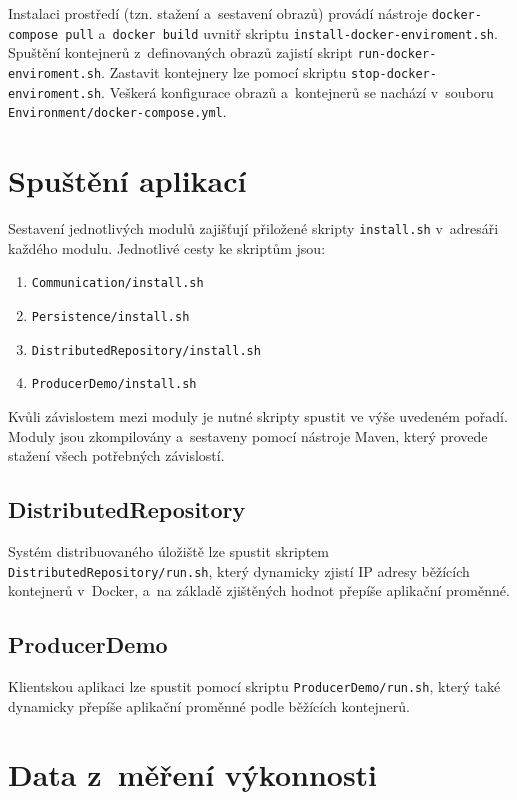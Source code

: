 Instalaci prostředí (tzn. stažení a~sestavení obrazů) provádí nástroje \texttt{docker-compose pull} a~\texttt{docker build} uvnitř skriptu \texttt{install-docker-enviroment.sh}. Spuštění kontejnerů z~definovaných obrazů zajistí skript \texttt{run-docker-enviroment.sh}. Zastavit kontejnery lze pomocí skriptu \texttt{stop-docker-enviroment.sh}. Veškerá konfigurace obrazů a~kontejnerů se nachází v~souboru \texttt{Environment/docker-compose.yml}.

\chapter{Spuštění aplikací} \label{launching}
Sestavení jednotlivých modulů zajišťují přiložené skripty \texttt{install.sh} v~adresáři každého modulu. Jednotlivé cesty ke skriptům jsou:

\begin{enumerate}
    \item \texttt{Communication/install.sh}
    
    \item \texttt{Persistence/install.sh}
    
    \item \texttt{DistributedRepository/install.sh}
    
    \item \texttt{ProducerDemo/install.sh}
\end{enumerate}

\noindent Kvůli závislostem mezi moduly je nutné skripty spustit ve výše uvedeném pořadí. Moduly jsou zkompilovány a~sestaveny pomocí nástroje Maven, který provede stažení všech potřebných závislostí.

\section{DistributedRepository}
Systém distribuovaného úložiště lze spustit skriptem \texttt{DistributedRepository/run.sh}, který dynamicky zjistí IP adresy běžících kontejnerů v~Docker, a~na základě zjištěných hodnot přepíše aplikační proměnné.

\section{ProducerDemo}
Klientskou aplikaci lze spustit pomocí skriptu \texttt{ProducerDemo/run.sh}, který také dynamicky přepíše aplikační proměnné podle běžících kontejnerů.

\chapter{Data z~měření výkonnosti}

